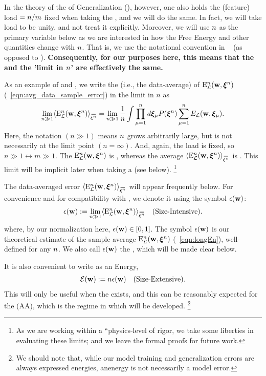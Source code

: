In the theory of the \StatisticalMechanics of Generalization (\SMOG), however, one also holds the (feature) load $=n/m$ fixed when taking the \ThermodynamicLimit, and we will do the same\cite{Gardner_1985, SST92, engel2001statistical,MM17_TR}. In fact, we will take load to be unity, and not treat it explicitly. 
Moreover,  we will use $n$  as the primary variable below as we are interested in how the Free Energy and other quantities change with $n$. That is, we use the notational convention in ~\cite{Solla2023} (as opposed to \cite{SST92}). \textbf{Consequently, for our purposes here, this means that the \ThermodynamicLimit and the '\LargeN limit in $n$' are effectively the same.}

As an example of \SizeExtensivity and \SizeIntensivity, 
we write the \ExpectedValue (i.e., the data-average) of \DataSampleError $\mathbf{\mathrm{E}}^{n}_{\mathcal{L}}(\mathbf{w}, \boldsymbol{\xi}^{n})$ (\EQN~\ref{eqn:avg_data_sample_error})
in the \LargeN limit in $n$ as
\begin{align}
\label{eqn:longEn}
  \lim_{n\gg 1} 
  \langle \DETOPXI\rangle_{\AVGNDXIn}=
  \lim_{n\gg 1}\frac{1}{\ND}
\int \prod_{\mu=1}^{\ND}d\XI_{\mu}P(\NDXIn)
\sum_{\mu=1}^{\ND}\DEL(\WVEC,\XI_{\mu}) .
\end{align}
Here, the notation $(n \gg 1)$ means $n$ grows arbitrarily large, but is not necessarily
at the limit point $(n=\infty)$. And, again, the load is fixed, so $n\gg 1 \leftrightarrow m \gg 1$.
The \TotalDataSampleError $\mathbf{\mathrm{E}}^{n}_{\mathcal{L}}(\mathbf{w}, \boldsymbol{\xi}^{n})$ is \SizeExtensive, whereas the
average $\langle\DETOPXI\rangle_{\AVGNDXIn}$ is \SizeIntensive.
This limit will be implicit later when taking a \SaddlePointApproximation (see below).
\footnote{As we are working within a ``physics-level of rigor, we take some liberties in evaluating these \LargeN limits; and we leave the formal proofs for future work.  }

The data-averaged error  $\langle \DETOPXI \rangle_{\AVGNDXIn}$ will appear frequently below.
For convenience and for compatibility with \cite{SST92}, we denote it using the symbol $\epsilon({\mathbf{w}})$:
\begin{align}
 \label{eqn:epsl}
 \EPSLw:=\lim_{n\gg 1}  \langle \DETOPXI \rangle_{\AVGNDXIn} \quad \text{(\SizeIntensive)}.
\end{align}
where, by our normalization here, $\epsilon({\mathbf{w}}) \in [0,1]$.
The symbol $\epsilon({\mathbf{w}})$ is our theoretical estimate of the sample average $\mathbf{\mathrm{E}}^{n}_{\mathcal{L}}(\mathbf{w}, \boldsymbol{\xi}^{n})$ (\EQN~\ref{eqn:longEn}),
well-defined for any $n$.
We also call $\epsilon({\mathbf{w}})$ the \emph{\EffectivePotential}, which will be made clear below.

It is also convenient to write \emph{\TotalEffectivePotential} as an Energy, 
\begin{align}
 \label{eqn:detox}
 \mathcal{E}(\mathbf{w}) := n\epsilon({\mathbf{w}})\quad \text{(Size-Extensive)}.
\end{align}
This will only be useful when the \ThermodynamicLimit exists, and this
can be reasonably expected for the \AnnealedApproximation (AA),
which is the regime in which \SETOL will be developed.%
\footnote{We should note that, while our model training and generalization errors are always expressed energies, anenergy is not necessarily a model error. }


